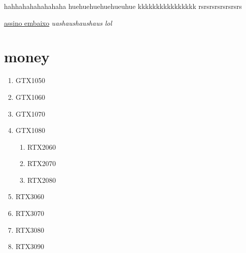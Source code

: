 \documentclass[12pt]{article}
\title{Continue a testar #3}
\author{Um autor qualquer}
\begin{document}
 
\maketitle
hahhahahahahahaha
huehuehuehuehueuhue
kkkkkkkkkkkkkkkk
rsrsrsrsrsrsrsrs

\underline{assino embaixo}
\it{uashaushaushaus}
lol
\par

\section{money}
\begin{enumerate} 
\item GTX1050
\item GTX1060
\item GTX1070
\item GTX1080
\begin{enumerate} 
\item RTX2060
\item RTX2070
\item RTX2080
\end{enumerate}
\item RTX3060
\item RTX3070
\item RTX3080
\item RTX3090
\end{enumerate}
\end{document}
